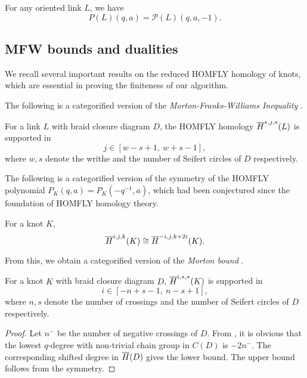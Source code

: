 \begin{theorem}
    For any oriented link $L$, we have
    \begin{equation*}
        P(L)(q,a) = \mathcal{P}(L)(q,a,-1).  
    \end{equation*}
\end{theorem}

\subsection{MFW bounds and dualities}

We recall several important results on the reduced HOMFLY homology of knots, which are essential in proving the finiteness of our algorithm.

The following is a categorified version of the \textit{Morton-Franks-Williams Inequality} \cite{Mor86, FW87}.
%
\begin{proposition} \label{prop:MFW-ineq}
    For a link $L$ with braid closure diagram $D$, the HOMFLY homology $\overline{H}^{*, j, *}(L)$ is supported in
    \[
        j \in [w - s + 1,\ w + s - 1],
    \]
    where $w, s$ denote the writhe and the number of Seifert circles of $D$ respectively. 
\end{proposition}

The following is a categorified version of the symmetry of the HOMFLY polynomial $P_K(q,a) = P_K(-q^{-1}, a)$, which had been conjectured since the foundation of HOMFLY homology theory.

\begin{proposition} \label{prop:q-sym}
    For a knot $K$,
    \[
        \overline{H}^{i, j, k}(K) \cong \overline{H}^{-i, j, k + 2i}(K).
    \]
\end{proposition}

From this, we obtain a categorified version of the \textit{Morton bound} \cite{Mor86}.

\begin{proposition} \label{prop:morton}
    For a knot $K$ with braid closure diagram $D$, $\overline{H}^{i, *, *}(K)$ is supported in
    \[
        i \in [-n + s - 1,\ n - s + 1],
    \]
    where $n, s$ denote the number of crossings and the number of Seifert circles of $D$ respectively. 
\end{proposition}

\begin{proof}
    Let $n^-$ be the number of negative crossings of $D$. From , it is obvious that the lowest $q$-degree with non-trivial chain group in $C(D)$ is $-2n^-$. The corresponding shifted degree in $\overline{H}(D)$ gives the lower bound. The upper bound follows from the symmetry.
\end{proof}

